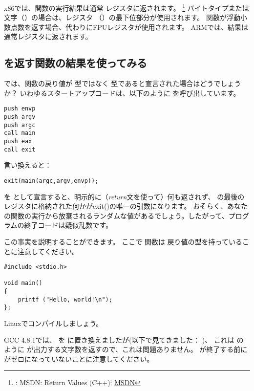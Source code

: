 

x86では、関数の実行結果は通常 \EAX レジスタに返されます。
\footnote{\Seealso: MSDN: Return Values (C++): \href{http://go.yurichev.com/17258}{MSDN}}
バイトタイプまたは文字（\Tchar）の場合は、レジスタ \EAX （\AL）の最下位部分が使用されます。
関数が浮動小数点数を返す場合、代わりにFPUレジスタが使用されます。 
ARMでは、結果は通常レジスタに返されます。

\subsection{\Tvoid を返す関数の結果を使ってみる}
\label{UseResultOfVoidFunc}

では、\main 関数の戻り値が \Tint 型ではなく \Tvoid 型であると宣言された場合はどうでしょうか？
いわゆるスタートアップコードは、以下のように \main を呼び出しています。

\begin{lstlisting}[style=customasmx86]
push envp
push argv
push argc
call main
push eax
call exit
\end{lstlisting}

言い換えると：

\begin{lstlisting}[style=customc]
exit(main(argc,argv,envp));
\end{lstlisting}

\main を \Tvoid として宣言すると、明示的に（\emph{return}文を使って）何も返されず、
\main の最後の \EAX レジスタに格納された何かがexit()の唯一の引数になります。
おそらく、あなたの関数の実行から放棄されるランダムな値があるでしょう。したがって、プログラムの終了コードは疑似乱数です。
\par
この事実を説明することができます。
ここで \main 関数は \Tvoid 戻り値の型を持っていることに注意してください。

\begin{lstlisting}[style=customc]
#include <stdio.h>

void main()
{
	printf ("Hello, world!\n");
};
\end{lstlisting}

Linuxでコンパイルしましょう。

GCC 4.8.1では、 \printf を \puts に置き換えましたが(以下で見てきました： )、
これは \printf のように \puts が出力する文字数を返すので、これは問題ありません。 
\main が終了する前に \EAX がゼロになっていないことに注意してください。

